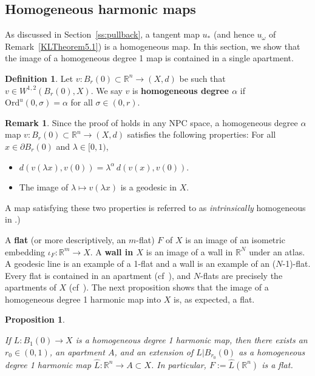 \documentclass[12pt]{amsart}
\newtheorem{proposition}[theorem]{Proposition}
\theoremstyle{definition}
\newtheorem{definition}[theorem]{Definition}
\newtheorem{remark}[theorem]{Remark}
\numberwithin{equation}{section}
\newcommand{\R}{\mathbb R}
\newcommand{\B}{B}
\begin{document}
\subsection{Homogeneous harmonic maps}
\label{sec:homogeneous}
As discussed in Section~\ref{ss:pullback},  a tangent map $u_*$ (and  hence $u_\omega$ of Remark~\ref{KLTheorem5.1}) is a homogeneous map.  In this section, we show that the image of a  homogeneous degree 1 map is contained in a single apartment.

\begin{definition}
Let $v:{B_r(0)}\subset \R^n \to (X,d)$ be such that $v \in W^{1,2}(B_{r}(0),X)$. We say $v$ is {\bf homogeneous degree $\alpha$}  if
$\text{Ord}^u(0,\sigma)=\alpha$ for all $\sigma \in (0,r)$.
\end{definition}


\begin{remark}
Since the proof of \cite[Lemma 3.2]{gromov-schoen} holds in any NPC space,   a homogeneous degree $\alpha$ map  $v:{B_r(0)}\subset \R^n \to (X,d)$ satisfies the following properties: For all $x \in \partial B_r(0)$ and $\lambda \in [0,1)$,
\begin{itemize}
\item
$
d(v(\lambda x), v(0)) = \lambda^\alpha \,d\left(v(x),v(0)\right)$.
\item
 The image of $\lambda \mapsto v(\lambda x)$ is a geodesic in $X$. 
 \end{itemize}
A map satisfying these two properties is referred to as  {\it intrinsically} homogeneous in \cite{gromov-schoen}.)
\end{remark}



A {\bf flat} (or more descriptively, an $m$-flat) $F$ of $X$ is an image of an isometric embedding $\iota_F:\R^m \rightarrow X$.   
A {\bf wall in $X$} is an image of a wall in $\R^N$ under an atlas.  A geodesic line is an example of a 1-flat and a wall is an example of an ($N$-1)-flat.
Every flat is contained in an apartment (cf~\cite[Proposition 4.6.1]{kleiner-leeb}), and $N$-flats are precisely the apartments of $X$ (cf~\cite[Corollary 4.6.2]{kleiner-leeb}).
The next proposition shows that the image of a homogeneous degree 1 harmonic map  into $X$ is, as expected, a flat.




\begin{proposition}\label{prop:flats}


If $L:\B_1(0) \to X$ is a homogeneous degree 1 harmonic map,  then there exists an $r_0 \in (0,1)$, an apartment $A$,  and an extension of $L|B_{r_0}(0)$ as a homogeneous degree 1 harmonic map $\hat L:\R^n \rightarrow A \subset X$.  In particular,    $F:=\hat L(\R^n)$ is a flat. 
\end{proposition}
\end{document}
